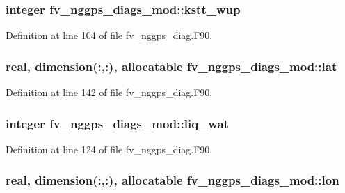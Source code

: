 \subsubsection[{kstt\-\_\-wup}]{\setlength{\rightskip}{0pt plus 5cm}integer fv\-\_\-nggps\-\_\-diags\-\_\-mod\-::kstt\-\_\-wup\hspace{0.3cm}{\ttfamily [private]}}\label{classfv__nggps__diags__mod_a86051f0376102e15a8a1a0fc8fe5429f}


Definition at line 104 of file fv\-\_\-nggps\-\_\-diag.\-F90.

\subsubsection[{lat}]{\setlength{\rightskip}{0pt plus 5cm}real, dimension(\-:,\-:), allocatable fv\-\_\-nggps\-\_\-diags\-\_\-mod\-::lat\hspace{0.3cm}{\ttfamily [private]}}\label{classfv__nggps__diags__mod_a134ea86f7c12011dda0297316dc3ea52}


Definition at line 142 of file fv\-\_\-nggps\-\_\-diag.\-F90.

\subsubsection[{liq\-\_\-wat}]{\setlength{\rightskip}{0pt plus 5cm}integer fv\-\_\-nggps\-\_\-diags\-\_\-mod\-::liq\-\_\-wat\hspace{0.3cm}{\ttfamily [private]}}\label{classfv__nggps__diags__mod_a972ef31ad558e0e5f6eec28762065b1f}


Definition at line 124 of file fv\-\_\-nggps\-\_\-diag.\-F90.

\subsubsection[{lon}]{\setlength{\rightskip}{0pt plus 5cm}real, dimension(\-:,\-:), allocatable fv\-\_\-nggps\-\_\-diags\-\_\-mod\-::lon\hspace{0.3cm}{\ttfamily [private]}}\label{classfv__nggps__diags__mod_aafdb15d16067525ed3d44c2cdde8e417}



